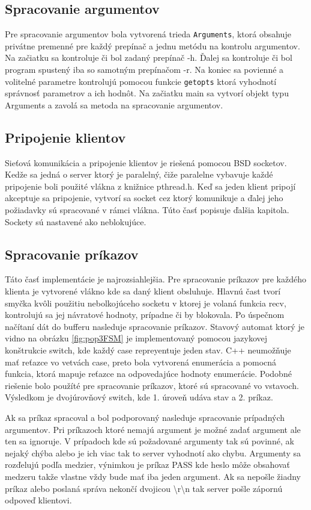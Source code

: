 \documentclass[11pt,a4paper]{article}
\begin{document}
\subsection{Spracovanie argumentov}
Pre spracovanie argumentov bola vytvorená trieda \texttt{Arguments}, ktorá obsahuje privátne premenné pre každý prepínač a jednu metódu na kontrolu argumentov. Na začiatku sa kontroluje či bol zadaný prepínač -h. Ďalej sa kontroluje či bol program spustený iba so samotným prepínačom -r. Na koniec sa povienné a volitelné parametre kontrolujú pomocou funkcie \texttt{getopts} ktorá vyhodnotí správnosť parametrov a ich hodnôt. Na začiatku main sa vytvorí objekt typu Arguments a zavolá sa metoda na spracovanie argumentov.

\subsection{Pripojenie klientov}
Sieťová komunikácia a pripojenie klientov je riešená pomocou BSD socketov. Kedže sa jedná o server ktorý je paralelný, čiže paralelne vybavuje každé pripojenie boli použité vlákna z knižnice pthread.h. Keď sa jeden klient pripojí akceptuje sa pripojenie, vytvorí sa socket cez ktorý komunikuje a ďalej jeho požiadavky sú spracované v rámci vlákna. Túto časť popisuje ďalšia kapitola. Sockety sú nastavené ako neblokujúce.

\subsection{Spracovanie príkazov}

Táto časť implementácie je najrozsiahlejšia. Pre spracovanie príkazov pre každého klienta je vytvorené vlákno kde sa daný klient obsluhuje. Hlavnú čast tvorí smyčka kvôli použitiu nebolkojúceho socketu v ktorej je volaná funkcia recv, kontrolujú sa jej návratové hodnoty, prípadne či by blokovala. Po úspečnom načítaní dát do bufferu nasleduje spracovanie príkazov. Stavový automat ktorý je vidno na obrázku \ref{fig:pop3FSM} je implementovaný pomocou jazykovej konštrukcie switch, kde každý case repreyentuje jeden stav. C++ neumožňuje mať reťazce vo vetvách case, preto bola vytvorená enumerácia a pomocná funkcia, ktorá mapuje reťazce na odpovedajúce hodnoty enumerácie. Podobné riešenie bolo použíté pre spracovanie príkazov, ktoré sú spracované vo vstavoch. Výsledkom je dvojúrovňový switch, kde 1. úroveň udáva stav a 2. príkaz.

Ak sa príkaz spracoval a bol podporovaný nasleduje spracovanie prípadných argumentov. Pri príkazoch ktoré nemajú argument je možné zadať argument ale ten sa ignoruje. V prípadoch kde sú požadované argumenty tak sú povinné, ak nejaký chýba alebo je ich viac tak to server vyhodnotí ako chybu. Argumenty sa rozďelujú podľa medzier, výnimkou je príkaz PASS kde heslo môže obsahovať medzeru takže vlastne vždy bude mať iba jeden argument. Ak sa nepošle žiadny príkaz alebo poslaná správa nekončí dvojicou \textbackslash r\textbackslash n tak server pošle zápornú odpoveď klientovi.
\end{document}
